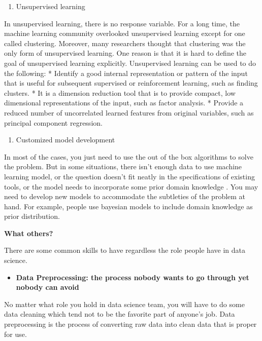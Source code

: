 \documentclass[12pt,]{krantz}
\providecommand{\tightlist}{%
  \setlength{\itemsep}{0pt}\setlength{\parskip}{0pt}}
\theoremstyle{definition}
\theoremstyle{definition}
\theoremstyle{definition}
\theoremstyle{remark}
\begin{document}
\begin{enumerate}
\def\labelenumi{(\arabic{enumi})}
\setcounter{enumi}{1}
\tightlist
\item
  Unsupervised learning
\end{enumerate}

In unsupervised learning, there is no response variable. For a long
time, the machine learning community overlooked unsupervised learning
except for one called clustering. Moreover, many researchers thought
that clustering was the only form of unsupervised learning. One reason
is that it is hard to define the goal of unsupervised learning
explicitly. Unsupervised learning can be used to do the following: *
Identify a good internal representation or pattern of the input that is
useful for subsequent supervised or reinforcement learning, such as
finding clusters. * It is a dimension reduction tool that is to provide
compact, low dimensional representations of the input, such as factor
analysis. * Provide a reduced number of uncorrelated learned features
from original variables, such as principal component regression.

\begin{enumerate}
\def\labelenumi{(\arabic{enumi})}
\setcounter{enumi}{2}
\tightlist
\item
  Customized model development
\end{enumerate}

In most of the cases, you just need to use the out of the box algorithms
to solve the problem. But in some situations, there isn't enough data to
use machine learning model, or the question doesn't fit neatly in the
specifications of existing tools, or the model needs to incorporate some
prior domain knowledge . You may need to develop new models to
accommodate the subtleties of the problem at hand. For example, people
use bayesian models to include domain knowledge as prior distribution.

\textbf{What others?}

There are some common skills to have regardless the role people have in
data science.

\begin{itemize}
\tightlist
\item
  \textbf{Data Preprocessing: the process nobody wants to go through yet
  nobody can avoid}
\end{itemize}

No matter what role you hold in data science team, you will have to do
some data cleaning which tend not to be the favorite part of anyone's
job. Data preprocessing is the process of converting raw data into clean
data that is proper for use.
\end{document}
